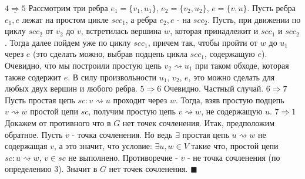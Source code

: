 \documentclass{article}
\begin{document}
\tab \(\underline{4 \Rightarrow 5}\)\newline
\tab\tab Рассмотрим три ребра \(e_1 = \{v_1, u_1\}\), \(e_2 = \{v_2, u_2\}\), \(e = \{v, u\}\). Пусть ребра \(e_1, e\) лежат на простом цикле \(scc_1\), а ребра \(e_2, e\) - на \(scc_2\).\newline
\tab\tab Пусть, при движении по циклу \(scc_2\) от \(v_2\) до \(v\), встретилась вершина \(w\), которая принадлежит и \(scc_1\) и \(scc_2\). Тогда далее пойдем уже по циклу \(scc_1\), причем так, чтобы пройти от \(w\) до \(u_1\) через \(e\) (это сделать можно, выбрав подцепь цикла \(scc_1\), содержащую \(e\)). Очевидно, что мы построили простую цепь \(v_2 \rightsquigarrow u_1\) при таком обходе, которая также содержит \(e\). В силу произвольности \(u_1\), \(v_2\), \(e\), это можно сделать для любых двух вершин и любого ребра.\newline\newline
\tab \(\underline{5 \Rightarrow 6}\)\newline
\tab\tab Очевидно. Частный случай.\newline\newline
\tab \(\underline{6 \Rightarrow 7}\)\newline
\tab\tab Пусть простая цепь \(sc: v \rightsquigarrow u\) проходит через \(w\). Тогда, взяв простую подцепь \(v \rightsquigarrow w\) простой цепи \(sc\), получим простую цепь \(v \rightsquigarrow w\), не содержащую \(u\).\newline\newline
\tab \(\underline{7 \Rightarrow 1}\)\newline
\tab\tab Докажем от противного что в \(G\) нет точек сочленения. Итак, предположим обратное. Пусть \(v\) - точка сочленения. Но ведь \(\exists\) простая цепь \(u \rightsquigarrow w\) не содержащая \(v\), а это значит, что условие: \(\exists u, w \in V\)  такие что, \forall простой цепи \(sc: u \rightsquigarrow w\), \(v \in sc\) не выполнено. Противоречие - \(v\) - не точка сочленения (по определению 3). Значит в \(G\) нет точек сочленения.
\(\blacksquare\)
\end{document}

